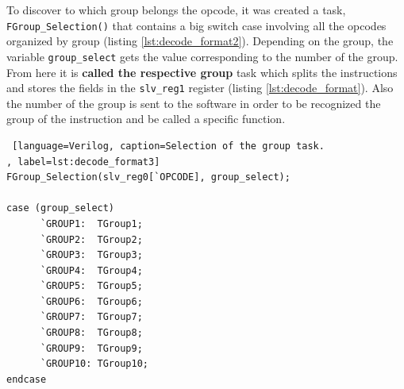 To discover to which group belongs the opcode, it was created a task, \texttt{FGroup\_Selection()} that contains a big switch case involving all the opcodes organized by group (listing \ref{lst:decode_format2}). Depending on the group, the variable \texttt{group\_select} gets the value corresponding to the number of the group. From here it is \textbf{called the respective group} task which splits the instructions and stores the fields in the \texttt{slv\_reg1} register (listing \ref{lst:decode_format}). Also the number of the group is sent to the software in order to be recognized the group of the instruction and be called a specific function.



\begin{lstlisting} [language=Verilog, caption=Selection of the group task.
, label=lst:decode_format3]
FGroup_Selection(slv_reg0[`OPCODE], group_select);        
           
case (group_select)
      `GROUP1:  TGroup1;
      `GROUP2:  TGroup2;
      `GROUP3:  TGroup3;
      `GROUP4:  TGroup4;
      `GROUP5:  TGroup5;
      `GROUP6:  TGroup6;
      `GROUP7:  TGroup7;
      `GROUP8:  TGroup8;
      `GROUP9:  TGroup9;
      `GROUP10: TGroup10;          
endcase
\end{lstlisting}




